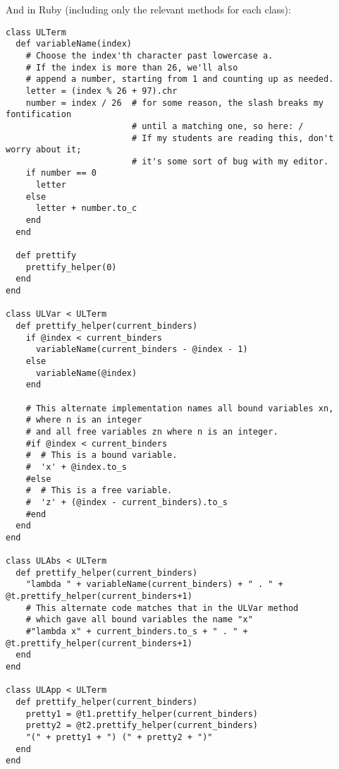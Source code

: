 \documentclass[11pt]{article}
\begin{document}
And in Ruby (including only the relevant methods for each class):
\begin{verbatim}
class ULTerm
  def variableName(index)
    # Choose the index'th character past lowercase a.
    # If the index is more than 26, we'll also
    # append a number, starting from 1 and counting up as needed.
    letter = (index % 26 + 97).chr
    number = index / 26  # for some reason, the slash breaks my fontification
                         # until a matching one, so here: /
                         # If my students are reading this, don't worry about it;
                         # it's some sort of bug with my editor.
    if number == 0
      letter
    else
      letter + number.to_c
    end
  end
  
  def prettify
    prettify_helper(0)
  end
end

class ULVar < ULTerm
  def prettify_helper(current_binders)
    if @index < current_binders
      variableName(current_binders - @index - 1)
    else
      variableName(@index)
    end
    
    # This alternate implementation names all bound variables xn,
    # where n is an integer
    # and all free variables zn where n is an integer.
    #if @index < current_binders
    #  # This is a bound variable.
    #  'x' + @index.to_s
    #else
    #  # This is a free variable.
    #  'z' + (@index - current_binders).to_s
    #end
  end
end

class ULAbs < ULTerm
  def prettify_helper(current_binders)
    "lambda " + variableName(current_binders) + " . " + @t.prettify_helper(current_binders+1)
    # This alternate code matches that in the ULVar method
    # which gave all bound variables the name "x" 
    #"lambda x" + current_binders.to_s + " . " + @t.prettify_helper(current_binders+1)
  end
end

class ULApp < ULTerm
  def prettify_helper(current_binders)
    pretty1 = @t1.prettify_helper(current_binders)
    pretty2 = @t2.prettify_helper(current_binders)
    "(" + pretty1 + ") (" + pretty2 + ")" 
  end
end
\end{verbatim}
\end{document}

